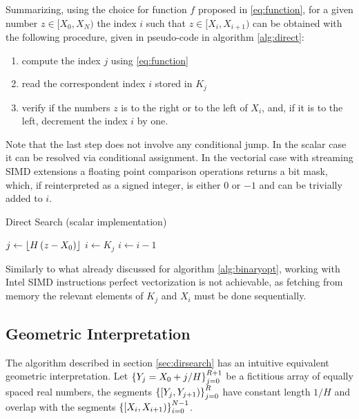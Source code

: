 \documentclass[preprint,1p,times]{elsarticle}
\begin{document}
Summarizing, using the choice for function $f$ proposed in \eqref{eq:function}, for a given number $z\in [X_0,X_N)$ the index $i$ such that $z\in [X_i,X_{i+1})$ can be obtained with the following procedure, given in pseudo-code in algorithm \ref{alg:direct}:
\begin{enumerate}
	\item compute the index $j$ using \eqref{eq:function}
	\item read the correspondent index $i$ stored in $K_j$
	\item verify if the numbers $z$ is to the right or to the left of $X_i$, and, if it is to the left, decrement the index $i$ by one.
\end{enumerate}
Note that the last step does not involve any conditional jump. In the scalar case it can be resolved via conditional assignment. In the vectorial case with streaming SIMD extensions a floating point comparison operations returns a bit mask, which, if reinterpreted as a signed integer, is either $0$ or $-1$ and can be trivially added to $i$.

\begin{algorithm}
	\caption{Direct Search (scalar implementation)}
	\label{alg:direct}
	\begin{algorithmic}
		\State $j \leftarrow \left \lfloor  H \, (z-X_0)  \right \rfloor$
		\State $i \leftarrow K_j$
		\State $i \leftarrow i-1$ 
		\EndIf
		\EndFunction
	\end{algorithmic}
\end{algorithm}

Similarly to what already discussed for algorithm \ref{alg:binaryopt}, working with Intel SIMD instructions perfect vectorization is not achievable, as fetching from memory the relevant elements of $K_j$ and $X_i$ must be done sequentially.

\subsection{Geometric Interpretation}
\label{sec:geometric}

The algorithm described in section \eqref{sec:dirsearch} has an intuitive equivalent geometric interpretation.
Let $\left \{ Y_j=X_0+j/H \right \}_{j=0}^{R+1}$ be a fictitious array of equally spaced real numbers, the segments $\left \{ [Y_{j},Y_{j+1}) \right \}_{j=0}^{R}$ have constant length $1/H$ and overlap with the segments $\left \{ [X_{i},X_{i+1}) \right \}_{i=0}^{N-1}$.
\end{document}
